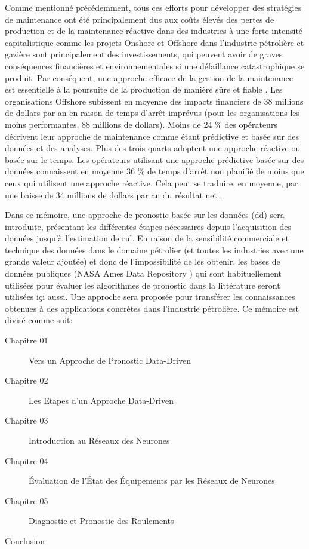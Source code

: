 Comme mentionné précédemment, tous ces efforts pour développer des stratégies de maintenance ont été principalement dus aux coûts élevés des pertes de production et de la maintenance réactive dans des industries à une forte intensité capitalistique comme les projets Onshore et Offshore dans l'industrie pétrolière et gazière sont principalement des investissements, qui peuvent avoir de graves conséquences financières et environnementales si une défaillance catastrophique se produit. Par conséquent, une approche efficace de la gestion de la maintenance est essentielle à la poursuite de la production de manière sûre et fiable \cite{Telford2011}. Les organisations Offshore subissent en moyenne des impacts financiers de 38 millions de dollars par an en raison de temps d'arrêt imprévus (pour les organisations les moins performantes, 88 millions de dollars). Moins de 24 \% des opérateurs décrivent leur approche de maintenance comme étant prédictive et basée sur des données et des analyses. Plus des trois quarts adoptent une approche réactive ou basée sur le temps. Les opérateurs utilisant une approche prédictive basée sur des données connaissent en moyenne 36 \% de temps d'arrêt non planifié de moins que ceux qui utilisent une approche réactive. Cela peut se traduire, en moyenne, par une baisse de 34 millions de dollars par an du résultat net \cite{Eriksen2016}.

Dans ce mémoire, une approche de pronostic basée sur les données (\acrlong{dd}) sera introduite, présentant les différentes étapes nécessaires depuis l'acquisition des données jusqu'à l'estimation de \acrshort{rul}. En raison de la sensibilité commerciale et technique des données dans le domaine pétrolier (et toutes les industries avec une grande valeur ajoutée) et donc de l'impossibilité de les obtenir, les bases de données publiques (NASA Ames Data Repository \cite{NASAAmes}) qui sont habituellement utilisées pour évaluer les algorithmes de pronostic dans la littérature seront utilisées içi aussi. Une approche sera proposée pour transférer les connaissances obtenues à des applications concrètes dans l'industrie pétrolière.
\newline
Ce mémoire est divisé comme suit:
\begin{description}
	\item[Chapitre 01] Vers un Approche de Pronostic Data-Driven
	\item[Chapitre 02] Les Etapes d'un Approche Data-Driven
	\item[Chapitre 03] Introduction au Réseaux des Neurones  
	\item[Chapitre 04] Évaluation de l'État des Équipements par les Réseaux de Neurones
	\item[Chapitre 05] Diagnostic et Pronostic des Roulements
	\item[Conclusion] 
\end{description}

